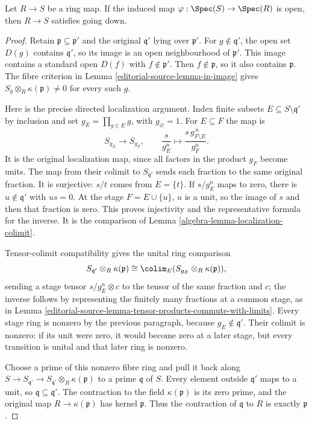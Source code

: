 \begin{lemma}
\label{editorial-source-lemma-open-going-down}
Let $R \to S$ be a ring map. If the induced map
$\varphi : \Spec(S) \to \Spec(R)$ is open, then
$R \to S$ satisfies going down.
\end{lemma}

\begin{proof}
Retain $\mathfrak p\subseteq\mathfrak p'$ and the original
$\mathfrak q'$ lying over $\mathfrak p'$.
For $g\notin\mathfrak q'$, the open set $D(g)$ contains
$\mathfrak q'$, so its image is an open neighbourhood of
$\mathfrak p'$. This image contains a standard open
$D(f)$ with $f\notin\mathfrak p'$. Then
$f\notin\mathfrak p$, so it also contains $\mathfrak p$.
The fibre criterion in Lemma \ref{editorial-source-lemma-in-image} gives
$S_g\otimes_R\kappa(\mathfrak p)\ne0$ for every such $g$.

Here is the precise directed localization argument. Index
finite subsets $E\subseteq S\setminus\mathfrak q'$ by
inclusion and set $g_E=\prod_{g\in E}g$, with $g_\varnothing=1$.
For $E\subseteq F$ the map is
$$
S_{g_E}\longrightarrow S_{g_F},\qquad
\frac{s}{g_E^n}\longmapsto
\frac{s\,g_{F\setminus E}^{\,n}}{g_F^n}.
$$
It is the original localization map, since all factors
in the product $g_F$ become units. The map from their
colimit to $S_{\mathfrak q'}$ sends each fraction to the
same original fraction. It is surjective: $s/t$ comes
from $E=\{t\}$. If $s/g_E^n$ maps to zero, there is
$u\notin\mathfrak q'$ with $us=0$. At the stage
$F=E\cup\{u\}$, $u$ is a unit, so the image of $s$
and then that fraction is zero. This proves injectivity
and the representative formula for the inverse. It is
the comparison of Lemma \ref{algebra-lemma-localization-colimit}.

Tensor-colimit compatibility gives the unital ring
comparison
$$
S_{\mathfrak q'}\otimes_R\kappa(\mathfrak p)
\cong\colim_E(S_{g_E}\otimes_R\kappa(\mathfrak p)),
$$
sending a stage tensor $s/g_E^n\otimes c$ to the tensor
of the same fraction and $c$; the inverse follows by
representing the finitely many fractions at a common
stage, as in Lemma \ref{editorial-source-lemma-tensor-products-commute-with-limits}.
Every stage ring is nonzero by the previous paragraph,
because $g_E\notin\mathfrak q'$. Their colimit is nonzero:
if its unit were zero, it would become zero at a later
stage, but every transition is unital and that later
ring is nonzero.

Choose a prime of this nonzero fibre ring and pull it
back along $S\to S_{\mathfrak q'}\to
S_{\mathfrak q'}\otimes_R\kappa(\mathfrak p)$ to a prime
$\mathfrak q$ of $S$. Every element outside
$\mathfrak q'$ maps to a unit, so
$\mathfrak q\subseteq\mathfrak q'$.
The contraction to the field $\kappa(\mathfrak p)$ is
its zero prime, and the original map $R\to\kappa(\mathfrak p)$
has kernel $\mathfrak p$. Thus the contraction of
$\mathfrak q$ to $R$ is exactly $\mathfrak p$.


\end{proof}
